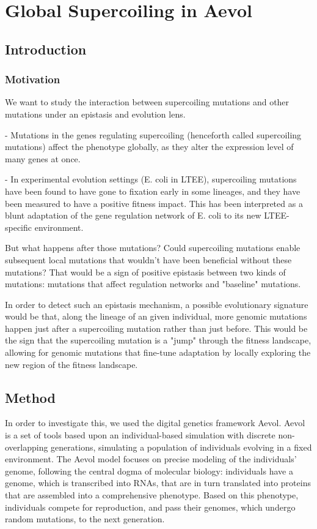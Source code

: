 \chapter{Global Supercoiling in Aevol}
\label{chap:aevol}

\section{Introduction}

\subsection{Motivation}

We want to study the interaction between supercoiling mutations and other  mutations under an epistasis and evolution lens.

- Mutations in the genes regulating supercoiling (henceforth called supercoiling mutations) affect the phenotype globally, as they alter the expression level of many genes at once.

- In experimental evolution settings (E. coli in LTEE), supercoiling mutations have been found to have gone to fixation early in some lineages, and they have been measured to have a positive fitness impact.
This has been interpreted as a blunt adaptation of the gene regulation network of E. coli to its new LTEE-specific environment.

But what happens after those mutations?
Could supercoiling mutations enable subsequent local mutations that wouldn't have been beneficial without these mutations?
That would be a sign of positive epistasis between two kinds of mutations: mutations that affect regulation networks and "baseline" mutations.

In order to detect such an epistasis mechanism, a possible evolutionary signature would be that, along the lineage of an given individual, more genomic mutations happen just after a supercoiling mutation rather than just before.
This would be the sign that the supercoiling mutation is a "jump" through the fitness landscape, allowing for genomic mutations that fine-tune adaptation by locally exploring the new region of the fitness landscape.

\section{Method}

In order to investigate this, we used the digital genetics framework Aevol.
Aevol is a set of tools based upon an individual-based simulation with discrete non-overlapping generations, simulating a population of individuals evolving in a fixed environment.
The Aevol model focuses on precise modeling of the individuals' genome, following the central dogma of molecular biology: individuals have a genome, which is transcribed into RNAs, that are in turn translated into proteins that are assembled into a comprehensive phenotype.
Based on this phenotype, individuals compete for reproduction, and pass their genomes, which undergo random mutations, to the next generation.

